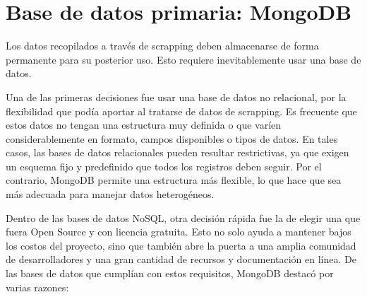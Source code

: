 \section{Base de datos primaria: MongoDB}

Los datos recopilados a través de scrapping deben almacenarse de forma permanente para su posterior uso. Esto requiere inevitablemente usar una base de datos.

Una de las primeras decisiones fue usar una base de datos no relacional, por la flexibilidad que podía aportar al tratarse de datos de scrapping. Es frecuente que estos datos no tengan una estructura muy definida o que varíen considerablemente en formato, campos disponibles o tipos de datos. En tales casos, las bases de datos relacionales pueden resultar restrictivas, ya que exigen un esquema fijo y predefinido que todos los registros deben seguir. Por el contrario, MongoDB permite una estructura más flexible, lo que hace que sea más adecuada para manejar datos heterogéneos.

Dentro de las bases de datos NoSQL, otra decisión rápida fue la de elegir una que fuera Open Source y con licencia gratuita. Esto no solo ayuda a mantener bajos los costos del proyecto, sino que también abre la puerta a una amplia comunidad de desarrolladores y una gran cantidad de recursos y documentación en línea. De las bases de datos que cumplían con estos requisitos, MongoDB destacó por varias razones:

